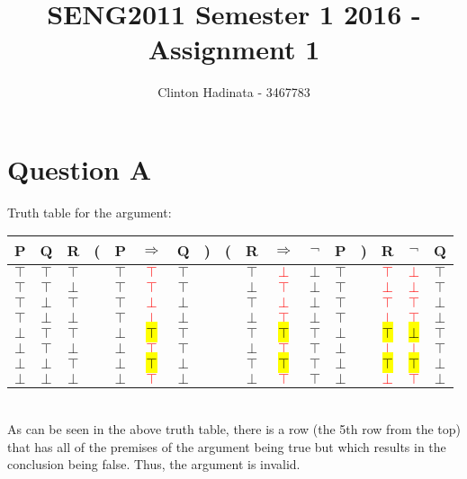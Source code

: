 \documentclass[a4paper]{article}
\title{SENG2011 Semester 1 2016 - Assignment 1}
\author{Clinton Hadinata - 3467783}
\begin{document}
\maketitle

\section{Question A}
Truth table for the argument:\\
\vspace{5mm}
\begin{tabular}{@{ }c@{ }@{ }c@{ }@{ }c | c@{}@{ }c@{ }@{ }c@{ }@{ }c@{ }@{}c@{ } | c@{}@{ }c@{ }@{ }c@{ }@{ }c@{ }@{ }c@{ }@{}c@{ } | c | c@{ }@{ }c}
P & Q & R & ( & P & $\Rightarrow$ & Q & ) & ( & R & $\Rightarrow$ & $\neg$ & P & ) & R & $\neg$ & Q\\
\hline 
$\top$ & $\top$ & $\top$ &  & $\top$ & \textcolor{red}{$\top$} & $\top$ &  &  & $\top$ & \textcolor{red}{$\bot$} & $\bot$ & $\top$ &  & \textcolor{red}{$\top$} & \textcolor{red}{$\bot$} & $\top$\\
$\top$ & $\top$ & $\bot$ &  & $\top$ & \textcolor{red}{$\top$} & $\top$ &  &  & $\bot$ & \textcolor{red}{$\top$} & $\bot$ & $\top$ &  & \textcolor{red}{$\bot$} & \textcolor{red}{$\bot$} & $\top$\\
$\top$ & $\bot$ & $\top$ &  & $\top$ & \textcolor{red}{$\bot$} & $\bot$ &  &  & $\top$ & \textcolor{red}{$\bot$} & $\bot$ & $\top$ &  & \textcolor{red}{$\top$} & \textcolor{red}{$\top$} & $\bot$\\
$\top$ & $\bot$ & $\bot$ &  & $\top$ & \textcolor{red}{$\bot$} & $\bot$ &  &  & $\bot$ & \textcolor{red}{$\top$} & $\bot$ & $\top$ &  & \textcolor{red}{$\bot$} & \textcolor{red}{$\top$} & $\bot$\\
$\bot$ & $\top$ & $\top$ &  & $\bot$ & \textcolor{red}{\hl{$\top$}} & $\top$ &  &  & $\top$ & \textcolor{red}{\hl{$\top$}} & $\top$ & $\bot$ &  & \textcolor{red}{\hl{$\top$}} & \textcolor{red}{\hl{$\bot$}} & $\top$\\
$\bot$ & $\top$ & $\bot$ &  & $\bot$ & \textcolor{red}{$\top$} & $\top$ &  &  & $\bot$ & \textcolor{red}{$\top$} & $\top$ & $\bot$ &  & \textcolor{red}{$\bot$} & \textcolor{red}{$\bot$} & $\top$\\
$\bot$ & $\bot$ & $\top$ &  & $\bot$ & \textcolor{red}{\hl{$\top$}} & $\bot$ &  &  & $\top$ & \textcolor{red}{\hl{$\top$}} & $\top$ & $\bot$ &  & \textcolor{red}{\hl{$\top$}} & \textcolor{red}{\hl{$\top$}} & $\bot$\\
$\bot$ & $\bot$ & $\bot$ &  & $\bot$ & \textcolor{red}{$\top$} & $\bot$ &  &  & $\bot$ & \textcolor{red}{$\top$} & $\top$ & $\bot$ &  & \textcolor{red}{$\bot$} & \textcolor{red}{$\top$} & $\bot$\\
\end{tabular}
\vspace{5mm}\\
As can be seen in the above truth table, there is a row (the 5th row from the top) that has all of the premises of the argument being true but which results in the conclusion being false. Thus, the argument is invalid. 
\end{document}
